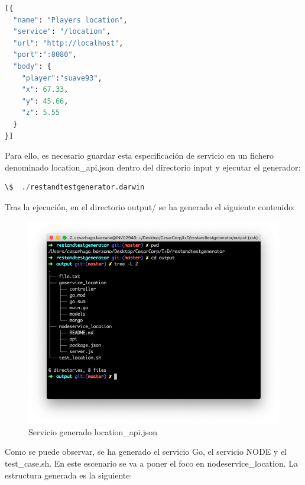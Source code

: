 \documentclass[a4paper,11pt]{book}
\begin{document}
\begin{lstlisting}[language=python,caption={ Ejemplo Entrada Generador: location\_api.json }]
[{
  "name": "Players location",
  "service": "/location",
  "url": "http://localhost",
  "port":":8080",
  "body": {
    "player":"suave93",
    "x": 67.33,
    "y": 45.66,
    "z": 5.55
  }
}]
\end{lstlisting}

Para ello, es necesario guardar esta especificación de servicio en un fichero denominado location\_api.json dentro del directorio input y ejecutar el generador:

\begin{lstlisting}[language=python,caption={ Ejemplo Ejecución Generador: location\_api.json }]
\$  ./restandtestgenerator.darwin 
\end{lstlisting} 

Tras la ejecución, en el directorio output/ se ha generado el siguiente contenido:

\begin{figure}[H]  
\centering 
\includegraphics[scale=0.35]{imagenes/t21.png}
\caption{ Servicio generado location\_api.json}  
\end{figure}

Como se puede observar, se ha generado el servicio Go, el servicio NODE y el test\_case.sh. En este escenario se va a poner el foco en nodeservice\_location. La estructura generada es la siguiente:
\end{document}
